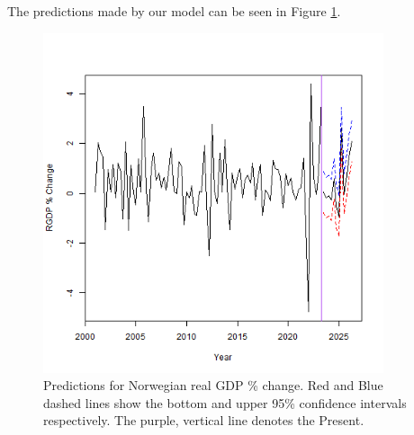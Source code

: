 \documentclass[11pt, a4paper]{article}
\begin{document}
	
	
	The predictions made by our model can be seen in Figure \ref{fig::predict}.
	
	\begin{figure}
		\includegraphics[width=10cm]{predictions.png}
		\centering
		\caption{Predictions for Norwegian real GDP \% change. Red and Blue dashed lines show the bottom and upper 95\% confidence intervals respectively. The purple, vertical line denotes the Present.}
		\label{fig::predict}
	\end{figure}
	
\end{document}
